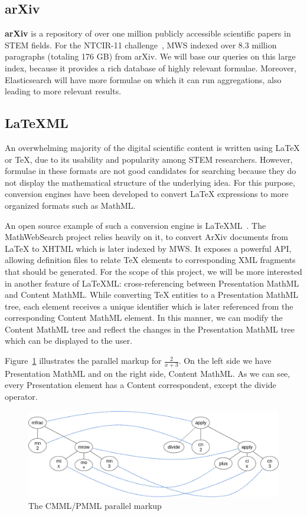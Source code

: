 \documentclass[a4paper,oneside]{article}
\def\MWS{\textsf{MWS}\xspace}
\def\mws{\textsf{MathWebSearch}\xspace}
\def\cmml{\textsf{Content MathML}\xspace}
\def\pmml{\textsf{Presentation MathML}\xspace}
\def\arxiv{\textsf{ArXiv}\xspace}
\def\latexml{\LaTeX{ML}\xspace}
\def\mathml{\textsf{MathML}\xspace}
\def\latex{\LaTeX\xspace}
\def\tex{\TeX\xspace}
\begin{document}
\subsection{arXiv}\label{subsec:arxiv}
\textbf{arXiv} is a repository of over one million publicly accessible
scientific papers in STEM fields. For the NTCIR-11
challenge~\cite{HamKohPro:man14},
MWS indexed over 8.3 million paragraphs (totaling 176 GB) from arXiv. We will
base our queries on this large index, because it provides a rich database of
highly relevant formulae. Moreover, Elasticsearch will have more formulae on
which it can run aggregations, also leading to more relevant results.

\subsection{\latexml}\label{subsec:latexml}
An overwhelming majority of the digital scientific content is written using
\latex or \tex, due to its usability and popularity among STEM researchers.
However, formulae in these formats are not good candidates for searching
because they do not display the mathematical structure of the underlying
idea. For this purpose, conversion engines have been developed to convert
\latex expressions to more organized formats such as \mathml.

An open source example of such a conversion engine is
\latexml~\cite{Miller:latexml:online}. The \mws project relies heavily on it,
to convert \arxiv documents from \latex to XHTML which is later indexed by \MWS.
It exposes a powerful API, allowing definition files to relate \tex elements to
corresponding XML fragments that should be generated.
For the scope of this project, we will be more interested in another feature of
\latexml: cross-referencing between \pmml and \cmml. While converting \tex
entities to a \pmml tree, each element receives a unique identifier which is
later referenced from the corresponding \cmml element. In this manner, we can
modify the \cmml tree and reflect the changes in the \pmml tree which can be
displayed to the user.

Figure~\ref{fig:crossreference_diag} illustrates the parallel markup for
$\frac{2}{x+3}$. On the left side we have \pmml and on the right side, \cmml.
As we can see, every Presentation element has a Content correspondent, except
the \textsf{divide} operator.

\begin{figure}[ht]\centering
    \includegraphics[scale=0.3]{img/crossreference_diag.png}
    \caption{The CMML/PMML parallel markup}\label{fig:crossreference_diag}
\end{figure}
\FloatBarrier
\end{document}
